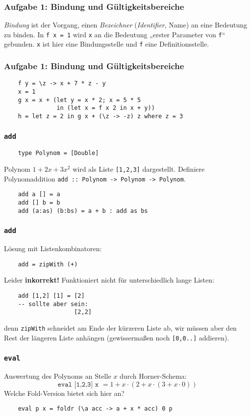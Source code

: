 \documentclass{beamer}
\date{2016-11-07/08}
\begin{document}
\normalsize
\normalem

\begin{frame}[plain]
  \titlepage
\end{frame}

\begin{frame}[fragile]
  \frametitle{Aufgabe 1: Bindung und Gültigkeitsbereiche}
  \emph{Bindung} ist der Vorgang, einen \emph{Bezeichner} (\emph{Identifier}, Name) an eine Bedeutung zu binden.
  In \lstinline{f x = 1} wird \lstinline{x} an die Bedeutung „erster Parameter von \lstinline{f}“ gebunden.
  \lstinline{x} ist hier eine Bindungsstelle und \lstinline{f} eine Definitionsstelle.
\end{frame}

\begin{frame}[fragile]
  \frametitle{Aufgabe 1: Bindung und Gültigkeitsbereiche}
  \begin{lstlisting}
    f y = \z -> x + 7 * z - y
    x = 1
    g x = x + (let y = x * 2; x = 5 * 5
               in (let x = f x 2 in x + y))
    h = let z = 2 in g x + (\z -> -z) z where z = 3
  \end{lstlisting}
\end{frame}

\begin{frame}[fragile]
  \frametitle{\lstinline{add}}
  \begin{lstlisting}
    type Polynom = [Double]
  \end{lstlisting}
  Polynom $1 + 2 x + 3 x^2$ wird als Liste \lstinline{[1,2,3]} dargestellt.
  Definiere Polynomaddition \lstinline{add :: Polynom -> Polynom -> Polynom}.
  \pause
  \begin{lstlisting}
    add a [] = a
    add [] b = b
    add (a:as) (b:bs) = a + b : add as bs
  \end{lstlisting}
\end{frame}

\begin{frame}[fragile]
  \frametitle{\texttt{add}}
  Lösung mit Listenkombinatoren:
  \begin{lstlisting}
    add = zipWith (+)
  \end{lstlisting}
  \pause
  Leider \textbf{inkorrekt!} Funktioniert nicht für unterschiedlich lange Listen:
  \begin{lstlisting}
    add [1,2] [1] = [2]
    -- sollte aber sein:
                    [2,2]
  \end{lstlisting}
  denn \lstinline{zipWith} schneidet am Ende der kürzeren Liste ab,
  wir müssen aber den Rest der längeren Liste anhängen (gewissermaßen noch \lstinline{[0,0..]} addieren).
\end{frame}

\begin{frame}[fragile]
  \frametitle{\lstinline{eval}}
  Auswertung des Polynoms an Stelle $x$ durch Horner-Schema:
  \[\texttt{eval [1,2,3] x }= 1 + x\cdot(2 + x\cdot(3 + x\cdot0))\]
  Welche Fold-Version bietet sich hier an?
  \pause
  \begin{lstlisting}
    eval p x = foldr (\a acc -> a + x * acc) 0 p
  \end{lstlisting}
\end{frame}
\end{document}
